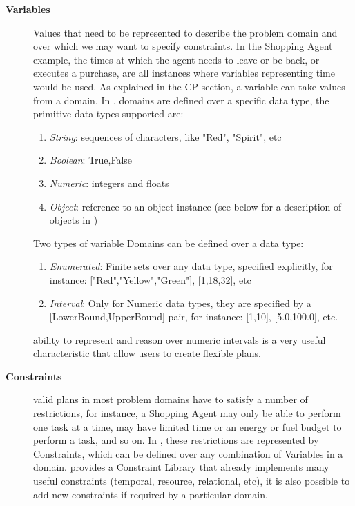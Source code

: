 \begin{description}

\item[\textbf{Variables}] Values that need to be represented to
  describe the problem domain and over which we may want to specify
  constraints. In the Shopping Agent example, the times at which the
  agent needs to leave or be back, or executes a purchase, are all
  instances where variables representing time would be used.  As
  explained in the \textsf{CP} section, a variable can take values
  from a domain. In \eu, domains are defined over a specific data
  type, the primitive data types supported are:

  \begin{enumerate}

  \item \textit{String}: sequences of characters, like "Red",
    "Spirit", etc

  \item \textit{Boolean}: {True,False}

  \item \textit{Numeric}: integers and floats

  \item \textit{Object}: reference to an object instance (see below
    for a description of objects in \eu)
  
\end {enumerate}

Two types of variable Domains can be defined over a data type:

  \begin{enumerate}

  \item \textit{Enumerated}: Finite sets over any data type, specified
    explicitly, for instance: ["Red","Yellow","Green"], [1,18,32], etc

  \item \textit{Interval}: Only for Numeric data types, they are
    specified by a [LowerBound,UpperBound] pair, for instance: [1,10],
    [5.0,100.0], etc.

  \end {enumerate}

  \eus ability to represent and reason over numeric intervals is a
  very useful characteristic that allow users to create flexible
  plans.

\item[\textbf{Constraints}] valid plans in most problem domains have
  to satisfy a number of restrictions, for instance, a Shopping Agent
  may only be able to perform one task at a time, may have limited
  time or an energy or fuel budget to perform a task, and so on. In
  \eu, these restrictions are represented by Constraints, which can be
  defined over any combination of Variables in a domain. \eu provides
  a Constraint Library that already implements many useful constraints
  (temporal, resource, relational, etc), it is also possible to add
  new constraints if required by a particular domain.


\end{description}
